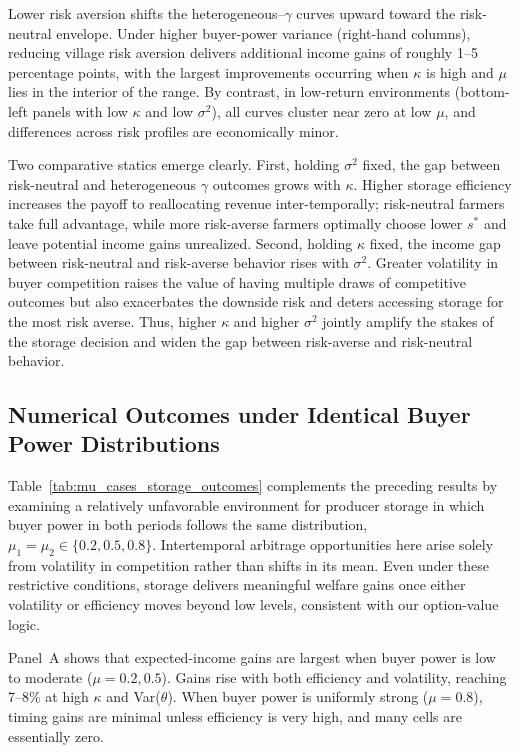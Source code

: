 Lower risk aversion shifts the heterogeneous--$\gamma$ curves upward toward the risk-neutral envelope. Under higher buyer-power variance (right-hand columns), reducing village risk aversion delivers additional income gains of roughly 1--5 percentage points, with the largest improvements occurring when $\kappa$ is high and $\mu$ lies in the interior of the range. By contrast, in low-return environments (bottom-left panels with low $\kappa$ and low $\sigma^2$), all curves cluster near zero at low $\mu$, and differences across risk profiles are economically minor.

Two comparative statics emerge clearly. First, holding $\sigma^2$ fixed, the gap between risk-neutral and heterogeneous $\gamma$ outcomes grows with $\kappa$. Higher storage efficiency increases the payoff to reallocating revenue inter-temporally; risk-neutral farmers take full advantage, while more risk-averse farmers optimally choose lower $s^*$ and leave potential income gains unrealized. Second, holding $\kappa$ fixed, the income gap between risk-neutral and risk-averse behavior rises with $\sigma^2$. Greater volatility in buyer competition raises the value of having multiple draws of competitive outcomes but also exacerbates the downside risk and deters accessing storage for the most risk averse. Thus, higher $\kappa$ and higher $\sigma^2$ jointly amplify the stakes of the storage decision and widen the gap between risk-averse and risk-neutral behavior.






\subsection{Numerical Outcomes under Identical Buyer Power Distributions}
\noindent 
Table~\ref{tab:mu_cases_storage_outcomes} complements the preceding results by examining a relatively unfavorable environment for producer storage in which buyer power in both periods follows the same distribution, $\mu_1=\mu_2\in\{0.2,0.5,0.8\}$. Intertemporal arbitrage opportunities here arise solely from volatility in competition rather than shifts in its mean. Even under these restrictive conditions, storage delivers meaningful welfare gains once either volatility or efficiency moves beyond low levels, consistent with our option-value logic.

Panel~A shows that expected-income gains are largest when buyer power is low to moderate ($\mu=0.2,0.5$). Gains rise with both efficiency and volatility, reaching 7--8\% at high $\kappa$ and Var($\theta$). When buyer power is uniformly strong ($\mu=0.8$), timing gains are minimal unless efficiency is very high, and many cells are essentially zero.

